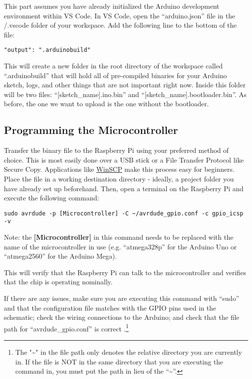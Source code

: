     This part assumes you have already initialized the Arduino development environment within VS Code.
    In VS Code, open the ``arduino.json'' file in the /.vscode folder of your workspace. Add the following line to the bottom of the file:

    \begin{lstlisting}[style=kaolstplain,linewidth=1.5\textwidth]
        "output": ".arduinobuild"
    \end{lstlisting}

    This will create a new folder in the root directory of the workspace called ``.arduinobuild'' that will hold all of pre-compiled binaries for your Arduino sketch, logs, and other things that are not important right now.
    Inside this folder will be two files: ``[sketch\_name].ino.bin'' and ``[sketch\_name].bootloader.bin''.
    As before, the one we want to upload is the one without the bootloader.\footnotemark[1]

    \subsection*{Programming the Microcontroller}

    Transfer the binary file to the Raspberry Pi using your preferred method of choice.
    This is most easily done over a USB stick or a File Transfer Protocol like Secure Copy.
    Applications like \href{https://winscp.net/eng/download.php}{WinSCP} make this process easy for beginners.
    Place the file in a working destination directory - ideally, a project folder you have already set up beforehand.
    Then, open a terminal on the Raspberry Pi and execute the following command:
    
    \begin{lstlisting}[style=kaolstplain,linewidth=1.5\textwidth]
        sudo avrdude -p [Microcontroller] -C ~/avrdude_gpio.conf -c gpio_icsp -v
    \end{lstlisting}

    Note: the \textbf{[Microcontroller]} in this command needs to be replaced with the name of the microcontroller in use (e.g. ``atmega328p'' for the Arduino Uno or ``atmega2560'' for the Arduino Mega).

    This will verify that the Raspberry Pi can talk to the microcontroller and verifies that the chip is operating nominally.

    If there are any issues, make sure you are executing this command with ``sudo'' and that the configuration file matches with the GPIO pins used in the schematic; check the wiring connections to the Arduino; and check that the file path for ``avrdude\_gpio.conf'' is correct .\footnote{The "\textasciitilde" in the file path only denotes the relative directory you are currently in. If the file is NOT in the same directory that you are executing the command in, you must put the path in lieu of the “\textasciitilde ”.}

